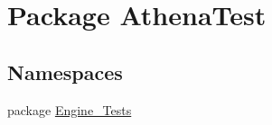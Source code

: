 \hypertarget{namespace_athena_test}{\section{Package Athena\-Test}
\label{namespace_athena_test}
}
\subsection*{Namespaces}
\begin{DoxyCompactItemize}
\item 
package \hyperlink{namespace_athena_test_1_1_engine___tests}{Engine\-\_\-\-Tests}
\end{DoxyCompactItemize}
